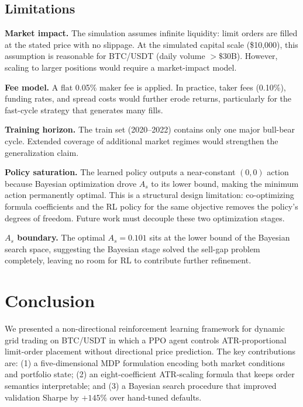 \documentclass[11pt, a4paper]{article}
\begin{document}
\subsection{Limitations}

\textbf{Market impact.}
The simulation assumes infinite liquidity: limit orders are filled at the stated
price with no slippage.
At the simulated capital scale (\$10,000), this assumption is reasonable for
BTC/USDT (daily volume $>\$30$B).
However, scaling to larger positions would require a market-impact model.

\textbf{Fee model.}
A flat 0.05\% maker fee is applied.
In practice, taker fees (0.10\%), funding rates, and spread costs would further
erode returns, particularly for the fast-cycle strategy that generates many fills.

\textbf{Training horizon.}
The train set (2020--2022) contains only one major bull-bear cycle.
Extended coverage of additional market regimes would strengthen the generalization
claim.

\textbf{Policy saturation.}
The learned policy outputs a near-constant $(0, 0)$ action because Bayesian
optimization drove $A_s$ to its lower bound, making the minimum action permanently
optimal.
This is a structural design limitation: co-optimizing formula coefficients and the
RL policy for the same objective removes the policy's degrees of freedom.
Future work must decouple these two optimization stages.

\textbf{$A_s$ boundary.}
The optimal $A_s = 0.101$ sits at the lower bound of the Bayesian search space,
suggesting the Bayesian stage solved the sell-gap problem completely,
leaving no room for RL to contribute further refinement.

\section{Conclusion}
\label{sec:conclusion}

We presented a non-directional reinforcement learning framework for dynamic grid
trading on BTC/USDT in which a PPO agent controls ATR-proportional limit-order
placement without directional price prediction.
The key contributions are: (1) a five-dimensional MDP formulation encoding both
market conditions and portfolio state; (2) an eight-coefficient ATR-scaling formula
that keeps order semantics interpretable; and (3) a Bayesian search procedure that
improved validation Sharpe by $+145\%$ over hand-tuned defaults.
\end{document}
